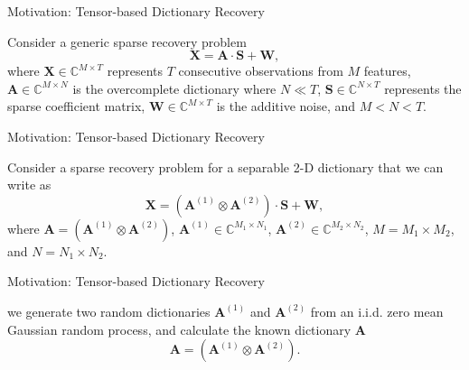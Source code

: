 \documentclass[newPxFont, numfooter, sectionpages]{beamer}
\begin{document}
\begin{frame}[c]{Motivation: Tensor-based Dictionary Recovery}

	Consider a generic sparse recovery problem
	\begin{equation}\label{eq:4_eq01}
		\textbf{X} = \textbf{A} \cdot \textbf{S} + \textbf{W},
	\end{equation}
	where $\textbf{X} \in \mathbb{C}^{M \times T}$ represents $T$ consecutive observations from $M$ features, $\textbf{A} \in \mathbb{C}^{M \times N}$ is the overcomplete dictionary where $N \ll T$, $\textbf{S} \in \mathbb{C}^{N \times T}$ represents the sparse coefficient matrix, $\textbf{W} \in \mathbb{C}^{M \times T}$ is the additive noise, and $M < N < T$.

\end{frame}
\begin{frame}[c]{Motivation: Tensor-based Dictionary Recovery}

	Consider a sparse recovery problem for a separable 2-D dictionary that we can write as
	\begin{equation}\label{eq:4_eq02}
		\textbf{X} = (\textbf{A}^{(1)} \otimes \textbf{A}^{(2)}) \cdot \textbf{S} + \textbf{W},
	\end{equation}
	where $\textbf{A} = (\textbf{A}^{(1)} \otimes \textbf{A}^{(2)})$, $\textbf{A}^{(1)} \in \mathbb{C}^{M_1 \times N_1}$, $\textbf{A}^{(2)} \in \mathbb{C}^{M_2 \times N_2}$, $M = M_1 \times M_2$, and $N = N_1 \times N_2$.

\end{frame}
\begin{frame}[c]{Motivation: Tensor-based Dictionary Recovery}

	we generate two random dictionaries $\textbf{A}^{(1)}$ and $\textbf{A}^{(2)}$ from an i.i.d. zero mean Gaussian random process, and calculate the known dictionary $\textbf{A}$
	\begin{equation}\label{eq:4_eq03}
		\textbf{A} = (\textbf{A}^{(1)} \otimes \textbf{A}^{(2)}).
	\end{equation}

\end{frame}
\end{document}
